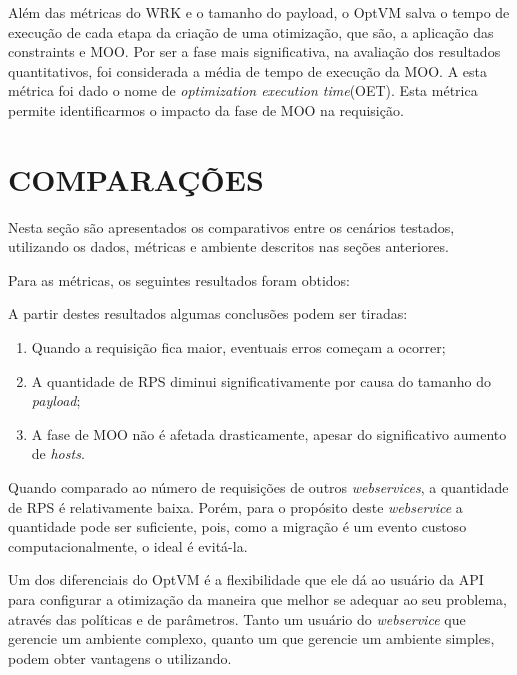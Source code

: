 Além das métricas do WRK e o tamanho do payload, o OptVM salva o tempo de execução de cada
etapa da criação de uma otimização, que são, a aplicação das constraints e MOO. 
Por ser a fase mais significativa, na avaliação dos resultados quantitativos, foi considerada a média de tempo
de execução da MOO. A esta métrica foi dado o nome de \textit{optimization execution time}(OET).
Esta métrica permite identificarmos o impacto da fase de MOO na requisição.

\section{COMPARAÇÕES}

Nesta seção são apresentados os comparativos entre os cenários testados, utilizando os dados, 
métricas e ambiente descritos nas seções anteriores. 

Para as métricas, os seguintes resultados foram obtidos:



A partir destes resultados algumas conclusões podem ser tiradas:

\begin{enumerate}
  \item Quando a requisição fica maior, eventuais erros começam a ocorrer;
  \item A quantidade de RPS diminui significativamente por causa do tamanho do \textit{payload};
  \item A fase de MOO não é afetada drasticamente, apesar do significativo aumento de \textit{hosts}.
\end{enumerate}

Quando comparado ao número de requisições de outros \textit{webservices}, a quantidade de RPS
é relativamente baixa. Porém, para o propósito deste \textit{webservice} a quantidade pode ser
suficiente, pois, como a migração é um evento custoso computacionalmente, o ideal é evitá-la.

Um dos diferenciais do OptVM é a flexibilidade que ele dá ao usuário da API para configurar
a otimização da maneira que melhor se adequar ao seu problema, através das políticas e de 
parâmetros. Tanto um usuário do \textit{webservice} que gerencie um ambiente complexo,
quanto um que gerencie um ambiente simples, podem obter vantagens o utilizando.
